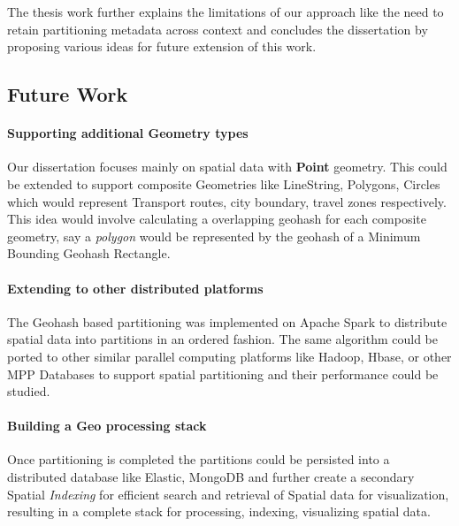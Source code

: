 \documentclass[article,type=msc,colorback,12pt,accentcolor=tud1d]{tudthesis}
\begin{document}
		   The thesis work further explains the limitations of our approach like the need to retain partitioning metadata across context and concludes the dissertation by proposing various ideas for future extension of this work.
		   		   
		   \clearpage
	   	   \subsection{Future Work}
	   	   
	   	   \paragraph{Supporting additional Geometry types} 
	   	   
	   	   Our dissertation focuses mainly on spatial data with \textbf{Point} geometry. This could be extended to support composite Geometries like LineString, Polygons, Circles which would represent Transport routes, city boundary, travel zones respectively. This idea would involve calculating a overlapping geohash for each composite geometry, say a \textit{polygon} would be represented by the geohash of a Minimum Bounding Geohash Rectangle.
   	  
	   	  \paragraph{Extending to other distributed platforms}
	   	  The Geohash based partitioning was implemented on Apache Spark to distribute spatial data into partitions in an ordered fashion. The same algorithm could be ported to other similar parallel computing platforms like Hadoop, Hbase, or other MPP Databases to support spatial partitioning and their performance could be studied. 
	   	  
	   	  \paragraph{Building a Geo processing stack}
	   	   Once partitioning is completed the partitions could be persisted into a distributed database like Elastic, MongoDB and further create a secondary Spatial\textit{ Indexing} for efficient search and retrieval of Spatial data for visualization, resulting in a complete stack for processing, indexing, visualizing spatial data. 	  
   	  
   	   
  \cleardoublepage
 
 \clearpage
 
 
 	  

\clearpage
\listoftables
\end{document}
